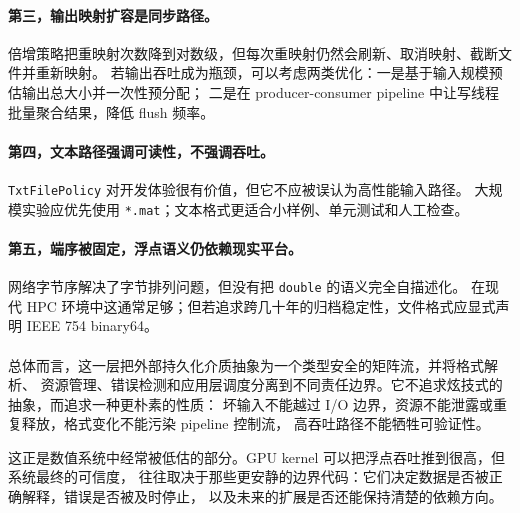 \paragraph{第三，输出映射扩容是同步路径。}
倍增策略把重映射次数降到对数级，但每次重映射仍然会刷新、取消映射、截断文件并重新映射。
若输出吞吐成为瓶颈，可以考虑两类优化：一是基于输入规模预估输出总大小并一次性预分配；
二是在 producer-consumer pipeline 中让写线程批量聚合结果，降低 flush 频率。

\paragraph{第四，文本路径强调可读性，不强调吞吐。}
\texttt{TxtFilePolicy} 对开发体验很有价值，但它不应被误认为高性能输入路径。
大规模实验应优先使用 \texttt{*.mat}；文本格式更适合小样例、单元测试和人工检查。

\paragraph{第五，端序被固定，浮点语义仍依赖现实平台。}
网络字节序解决了字节排列问题，但没有把 \texttt{double} 的语义完全自描述化。
在现代 HPC 环境中这通常足够；但若追求跨几十年的归档稳定性，文件格式应显式声明 IEEE 754 binary64。

\paragraph{}
总体而言，这一层把外部持久化介质抽象为一个类型安全的矩阵流，并将格式解析、
资源管理、错误检测和应用层调度分离到不同责任边界。它不追求炫技式的抽象，而追求一种更朴素的性质：
坏输入不能越过 I/O 边界，资源不能泄露或重复释放，格式变化不能污染 pipeline 控制流，
高吞吐路径不能牺牲可验证性。

这正是数值系统中经常被低估的部分。GPU kernel 可以把浮点吞吐推到很高，但系统最终的可信度，
往往取决于那些更安静的边界代码：它们决定数据是否被正确解释，错误是否被及时停止，
以及未来的扩展是否还能保持清楚的依赖方向。
